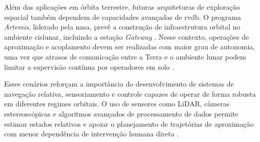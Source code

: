 Além das aplicações em órbita terrestre, futuras arquiteturas de exploração espacial também dependem de capacidades avançadas de \gls{rvdb}. 
O programa \emph{Artemis}, liderado pela \gls{nasa}, prevê a construção de infraestrutura orbital no ambiente cislunar, incluindo a estação \emph{Gateway} \cite{nasaArtemis}. 
Nesse contexto, operações de aproximação e acoplamento devem ser realizadas com maior grau de autonomia, uma vez que atrasos de comunicação entre a Terra e o ambiente lunar podem limitar a supervisão contínua por operadores em solo \cite{keeports2006}.

Esses cenários reforçam a importância do desenvolvimento de sistemas de navegação relativa, sensoriamento e controle capazes de operar de forma robusta em diferentes regimes orbitais. 
O uso de sensores como LiDAR, câmeras estereoscópicas e algoritmos avançados de processamento de dados permite estimar estados relativos e apoiar o planejamento de trajetórias de aproximação com menor dependência de intervenção humana direta \cite{farkasvolgyi2023,ibmComputerVision}.
